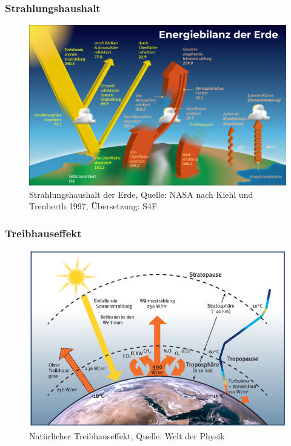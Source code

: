 \begin{frame}
  \frametitle{Strahlungshaushalt}
  
  \begin{figure}
  	\centering
  	\includegraphics[width=0.8\linewidth]{bilder/Energiebilanz_der_Erde_NASA.png}
  	\caption{Strahlungshaushalt der Erde, Quelle: NASA nach Kiehl und Trenberth 1997, Übersetzung: S4F} %
  \end{figure}
  
\end{frame}


\begin{frame}
  \frametitle{Treibhauseffekt}
  \begin{figure}
  	\centering
  	\includegraphics[width=0.8\linewidth]{bilder/Treibhauseffekt_welt_der_physik.png}
  	\caption{Natürlicher Treibhauseffekt, Quelle: Welt der Physik}
  \end{figure}
\end{frame}

